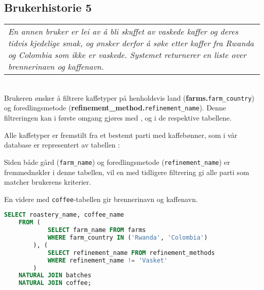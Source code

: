 \subsection{Brukerhistorie 5}

\begin{tabular}{ | p{} }
    \textsl{En annen bruker er lei av å bli skuffet av vaskede kaffer og deres tidvis kjedelige smak, og ønsker derfor å søke etter kaffer fra Rwanda og Colombia som ikke er vaskede.
    Systemet returnerer en liste over brennerinavn og kaffenavn.}
\end{tabular} \\

Brukeren ønsker å filtrere kaffetyper på henholdsvis land (\textbf{farms.}\verb|farm_country|) og foredlingsmetode (\textbf{refinement\_method.}\verb|refinement_name|).
Denne filtreringen kan i første omgang gjøres med ,  og  i de respektive tabellene.

Alle kaffetyper er fremstilt fra et bestemt parti med kaffebønner, som i vår database er representert av tabellen : \\


Siden både gård (\verb|farm_name|) og foredlingsmetode (\verb|refinement_name|) er fremmednøkler i denne tabellen,
vil en  med tidligere filtrering gi alle parti som matcher brukerens kriterier. 

En videre  med \verb|coffee|-tabellen gir brennerinavn og kaffenavn. \\

\begin{lstlisting}[language=SQL]
    SELECT roastery_name, coffee_name
    FROM (
            SELECT farm_name FROM farms
            WHERE farm_country IN ('Rwanda', 'Colombia')
        ), (
            SELECT refinement_name FROM refinement_methods
            WHERE refinement_name != 'Vasket'
        )
    NATURAL JOIN batches
    NATURAL JOIN coffee;
\end{lstlisting}
